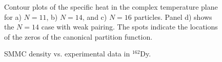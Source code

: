 \documentclass[preprint,rmp,aps,floatfix]{revtex4}
\begin{document}
\begin{figure}
\caption{Contour plots of the specific heat in the complex temperature plane
for a) $N=11$, b) $N=14$, and c) $N=16$ particles. Panel d) 
shows the $N=14$ case with weak pairing.  
The spots indicate the locations of the 
zeros of the canonical partition function.} 
\label{fig:contourplot}
\end{figure}


\begin{figure}
\caption{SMMC density vs. experimental
data in $^{162}$Dy.
\label{fig:dy162}}
\end{figure}
\end{document}
